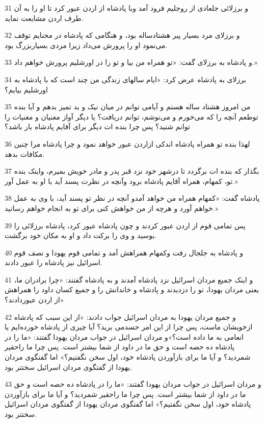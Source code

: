 \par 31 و برزلائی جلعادی از روجلیم فرود آمد وبا پادشاه از اردن عبور کرد تا او را به آن طرف اردن مشایعت نماید.
\par 32 و برزلای مرد بسیار پیر هشتادساله بود، و هنگامی که پادشاه در محنایم توقف می‌نمود او را پرورش می‌داد زیرا مردی بسیاربزرگ بود.
\par 33 و پادشاه به برزلای گفت: «تو همراه من بیا و تو را در اورشلیم پرورش خواهم داد.»
\par 34 برزلای به پادشاه عرض کرد: «ایام سالهای زندگی من چند است که با پادشاه به اورشلیم بیایم؟
\par 35 من امروز هشتاد ساله هستم و آیامی توانم در میان نیک و بد تمیز بدهم و آیا بنده توطعم آنچه را که می‌خورم و می‌نوشم، توانم دریافت؟ یا دیگر آواز مغنیان و مغنیات را توانم شنید؟ پس چرا بنده ات دیگر برای آقایم پادشاه بار باشد؟
\par 36 لهذا بنده تو همراه پادشاه اندکی ازاردن عبور خواهد نمود و چرا پادشاه مرا چنین مکافات بدهد.
\par 37 بگذار که بنده ات برگردد تا درشهر خود نزد قبر پدر و مادر خویش بمیرم، واینک بنده تو، کمهام، همراه آقایم پادشاه برود وآنچه در نظرت پسند آید با او به عمل آور.»
\par 38 پادشاه گفت: «کمهام همراه من خواهد آمدو آنچه در نظر تو پسند آید، با وی به عمل خواهم آورد و هر‌چه از من خواهش کنی برای تو به انجام خواهم رسانید.»
\par 39 پس تمامی قوم از اردن عبور کردند و چون پادشاه عبور کرد، پادشاه برزلائی را بوسید و وی را برکت داد و او به مکان خود برگشت.
\par 40 و پادشاه به جلجال رفت وکمهام همراهش آمد و تمامی قوم یهودا و نصف قوم اسرائیل نیز پادشاه را عبور دادند.
\par 41 و اینک جمیع مردان اسرائیل نزد پادشاه آمدند و به پادشاه گفتند: «چرا برادران ما، یعنی مردان یهودا، تو را دزدیدند و پادشاه و خاندانش را و جمیع کسان داود را همراهش از اردن عبوردادند؟»
\par 42 و جمیع مردان یهودا به مردان اسرائیل جواب دادند: «از این سبب که پادشاه ازخویشان ماست، پس چرا از این امر حسدمی برید؟ آیا چیزی از پادشاه خورده‌ایم یا انعامی به ما داده است؟»و مردان اسرائیل در جواب مردان یهودا گفتند: «ما را در پادشاه ده حصه است و حق ما در داود از شما بیشتر است. پس چرا ما راحقیر شمردید؟ و آیا ما برای بازآوردن پادشاه خود، اول سخن نگفتیم؟» اما گفتگوی مردان یهودا از گفتگوی مردان اسرائیل سختتر بود.
\par 43 و مردان اسرائیل در جواب مردان یهودا گفتند: «ما را در پادشاه ده حصه است و حق ما در داود از شما بیشتر است. پس چرا ما راحقیر شمردید؟ و آیا ما برای بازآوردن پادشاه خود، اول سخن نگفتیم؟» اما گفتگوی مردان یهودا از گفتگوی مردان اسرائیل سختتر بود.
 
